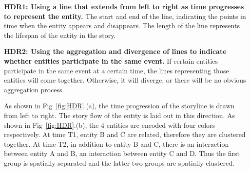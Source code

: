 \documentclass[review,journal]{vgtc}         %
\begin{document}
  \textbf{HDR1: Using a line that extends from left to right as time progresses to represent the entity.} The start and end of the line, indicating the points in time when the entity appears and disappears. The length of the line represents the lifespan of the entity in the story.

  \textbf{HDR2: Using the aggregation and divergence of lines to indicate whether entities participate in the same event.} If certain entities participate in the same event at a certain time, the lines representing those entities will come together. Otherwise, it will diverge, or there will be no obvious aggregation process.



As shown in Fig~\ref{fig:HDR}.(a), the time progression of the storyline is drawn from left to right. The story flow of the entity is laid out in this direction. 
As shown in Fig~\ref{fig:HDR}.(b), the 4 entities are encoded with four colors respectively. At time T1, entity B and C are related, therefore they are clustered together. 
At time T2, in addition to entity B and C, there is an interaction between entity A and B, an interaction between entity C and D. 
Thus the first group is spatially separated and the latter two groups are spatially clustered.

\end{document}
